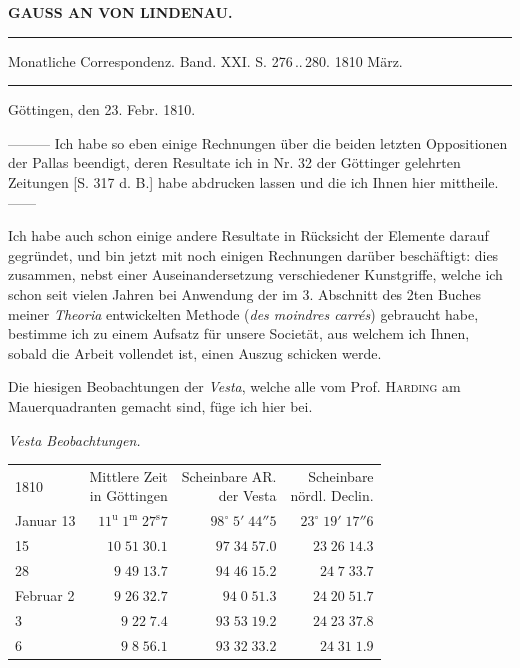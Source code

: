 \clearpage{}

\begin{center}\textbf{GAUSS AN VON LINDENAU.}\par\vspace{4pt}\hrule\vspace{4pt}\fontsize{10}{12}\selectfont Monatliche Correspondenz. Band. XXI. S. 276\,..\,280. 1810 März.\par\vspace{4pt}\hrule\vspace{4pt}\end{center}
\begin{flushright}Göttingen, den 23. Febr. 1810.\end{flushright}

\par\indent ---\enspace---\enspace--- Ich habe so eben einige Rechnungen über die beiden letzten Oppositionen der Pallas beendigt, deren Resultate ich in Nr. 32 der Göttinger gelehrten Zeitungen [S. 317 d. B.] habe abdrucken lassen und die ich Ihnen hier mittheile. ---\enspace---

Ich habe auch schon einige andere Resultate in Rücksicht der Elemente darauf gegründet, und bin jetzt mit noch einigen Rechnungen darüber beschäftigt: dies zusammen, nebst einer Auseinandersetzung verschiedener Kunstgriffe, welche ich schon seit vielen Jahren bei Anwendung der im 3. Abschnitt des 2ten Buches meiner \emph{Theoria} entwickelten Methode (\emph{des moindres carrés}) gebraucht habe, bestimme ich zu einem Aufsatz für unsere Societät, aus welchem ich Ihnen, sobald die Arbeit vollendet ist, einen Auszug schicken werde.

Die hiesigen Beobachtungen der \emph{Vesta}, welche alle vom Prof. \textsc{Harding} am Mauerquadranten gemacht sind, füge ich hier bei.

\begin{center}\emph{Vesta Beobachtungen.}\end{center}
\begin{center}\fontsize{10}{12}\selectfont\setlength{\tabcolsep}{5pt}\renewcommand{\arraystretch}{1.15}\begin{tabular}{lrrr}
1810 & \shortstack{Mittlere Zeit\\in Göttingen} & \shortstack{Scheinbare AR.\\der Vesta} & \shortstack{Scheinbare\\nördl. Declin.}\\
Januar 13 & $11^{\text{u}}\;1^{\text{m}}\;27^{\text{s}}7$ & $98^\circ\;5'\;44''5$ & $23^\circ\;19'\;17''6$\\
15 & $10\;51\;30.1$ & $97\;34\;57.0$ & $23\;26\;14.3$\\
28 & $9\;49\;13.7$ & $94\;46\;15.2$ & $24\;7\;33.7$\\
Februar 2 & $9\;26\;32.7$ & $94\;0\;51.3$ & $24\;20\;51.7$\\
3 & $9\;22\;7.4$ & $93\;53\;19.2$ & $24\;23\;37.8$\\
6 & $9\;8\;56.1$ & $93\;32\;33.2$ & $24\;31\;1.9$\\
\end{tabular}\end{center}

